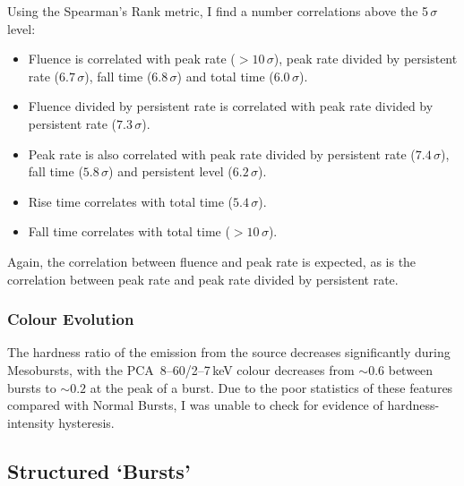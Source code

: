 \par Using the Spearman's Rank metric, I find a number correlations above the 5$\,\sigma$ level:
\begin{itemize}
\item Fluence is correlated with peak rate ($>10\,\sigma$), peak rate divided by persistent rate ($6.7\,\sigma$), fall time ($6.8\,\sigma$) and total time ($6.0\,\sigma$).
\item Fluence divided by persistent rate is correlated with peak rate divided by persistent rate ($7.3\,\sigma$).
\item Peak rate is also correlated with peak rate divided by persistent rate ($7.4\,\sigma$), fall time ($5.8\,\sigma$) and persistent level ($6.2\,\sigma$).
\item Rise time correlates with total time ($5.4\,\sigma$).
\item Fall time correlates with total time ($>10\,\sigma$).
\end{itemize}

Again, the correlation between fluence and peak rate is expected, as is the correlation between peak rate and peak rate divided by persistent rate.

\subsubsection{Colour Evolution}

\par The hardness ratio of the emission from the source decreases significantly during Mesobursts, with the PCA\indexpca\ 8--60/2--7\,keV colour decreases from $\sim0.6$ between bursts to $\sim0.2$ at the peak of a burst.  Due to the poor statistics of these features compared with Normal Bursts, I was unable to check for evidence of hardness-intensity hysteresis.

\subsection{Structured `Bursts'}

